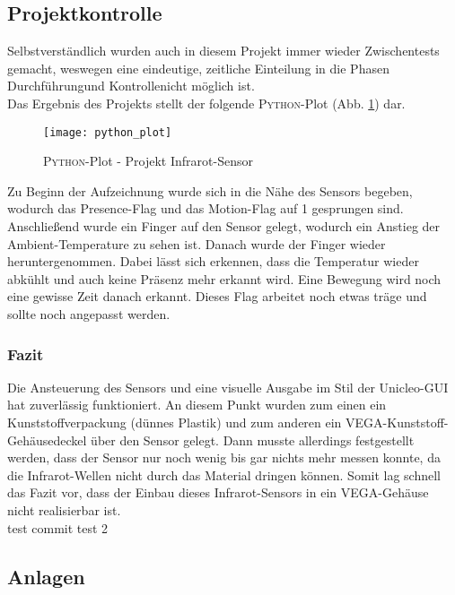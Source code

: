 \documentclass[
	letterpaper, %
	10pt, %
]{CSUniSchoolLabReport}
\begin{document}
\begin{spacing}{1.6}
\subsection{Projektkontrolle}
Selbstverständlich wurden auch in diesem Projekt immer wieder Zwischentests gemacht, weswegen eine eindeutige, zeitliche Einteilung in die Phasen \glqq Durchführung\grqq und \glqq Kontrolle\grqq nicht möglich ist.\\
Das Ergebnis des Projekts stellt der folgende \textsc{Python}-Plot (Abb. \ref{fig:python_plot}) dar.
\begin{figure}[H]
    \centering
    \texttt{[image: python\_plot]}
    \caption{\textsc{Python}-Plot - Projekt \glqq Infrarot-Sensor\grqq}
    \label{fig:python_plot}
\end{figure}
Zu Beginn der Aufzeichnung wurde sich in die Nähe des Sensors begeben, wodurch das Presence-Flag und das Motion-Flag auf 1 gesprungen sind. Anschließend wurde ein Finger auf den Sensor gelegt, wodurch ein Anstieg der Ambient-Temperature zu sehen ist. Danach wurde der Finger wieder heruntergenommen. Dabei lässt sich erkennen, dass die Temperatur wieder abkühlt und auch keine Präsenz mehr erkannt wird. Eine Bewegung wird noch eine gewisse Zeit danach erkannt. Dieses Flag arbeitet noch etwas träge und sollte noch angepasst werden.\\

\subsubsection{Fazit}
Die Ansteuerung des Sensors und eine visuelle Ausgabe im Stil der Unicleo-GUI hat zuverlässig funktioniert. An diesem Punkt wurden zum einen ein Kunststoffverpackung (dünnes Plastik) und zum anderen ein VEGA-Kunststoff-Gehäusedeckel über den Sensor gelegt. Dann musste allerdings festgestellt werden, dass der Sensor nur noch wenig bis gar nichts mehr messen konnte, da die Infrarot-Wellen nicht durch das Material dringen können. Somit lag schnell das Fazit vor, dass der Einbau dieses Infrarot-Sensors in ein VEGA-Gehäuse nicht realisierbar ist.
\\test commit test 2


\newpage
\listoffigures

\newpage
\listoftables

\newpage
\lstlistoflistings

\newpage
\begin{landscape}
    \section{Anlagen}

\end{landscape}
\end{spacing}
\end{document}
